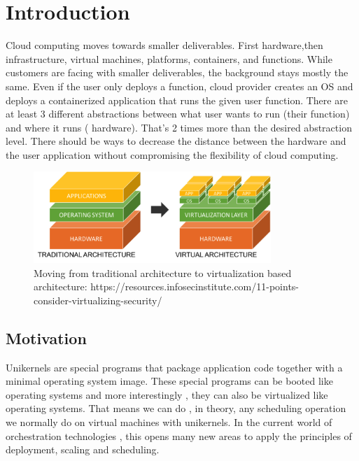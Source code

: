 
\chapter{Introduction}\label{chapter:introduction}
Cloud computing moves towards smaller deliverables. First hardware,then infrastructure, virtual machines, platforms, containers, and functions. While customers are facing with smaller deliverables, the background stays mostly the same. Even if the user only deploys a function, cloud provider creates an OS and deploys a containerized application that runs the given user function. There are at least 3 different abstractions between what user wants to run (their function) and where it runs ( hardware). That's 2 times more than the desired abstraction level. There should be ways to decrease the distance between the hardware and the user application without compromising the flexibility of cloud computing. 
\begin{figure}[htpb]
  \centering
  \includegraphics[width=0.8\textwidth]{figures/1-123.png}
  \caption{Moving from traditional architecture to virtualization based architecture: https://resources.infosecinstitute.com/11-points-consider-virtualizing-security/} \label{fig:arch}
\end{figure}
\section{Motivation}
Unikernels are special programs that package application code together with a minimal operating system image.\cite{7396164} These special programs can be booted like operating systems and more interestingly , they can also be virtualized like operating systems. That means we can do , in theory, any scheduling operation we normally do on virtual machines with unikernels. In the current world of orchestration technologies , this opens many new areas to apply the principles of deployment, scaling and scheduling.

